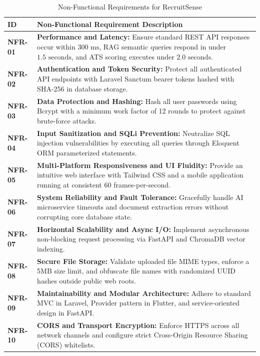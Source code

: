 \begin{table}[H]
\centering
\small
\caption{Non-Functional Requirements for RecruitSense}
\label{tab:non_functional_reqs}
\begin{tabular}{|l|p{12cm}|}
\hline
\textbf{ID} & \textbf{Non-Functional Requirement Description} \\ \hline
\textbf{NFR-01} & \textbf{Performance and Latency:} Ensure standard REST API responses occur within $300\text{ ms}$, RAG semantic queries respond in under $1.5\text{ seconds}$, and ATS scoring executes under $2.0\text{ seconds}$. \\ \hline
\textbf{NFR-02} & \textbf{Authentication and Token Security:} Protect all authenticated API endpoints with Laravel Sanctum bearer tokens hashed with SHA-256 in database storage. \\ \hline
\textbf{NFR-03} & \textbf{Data Protection and Hashing:} Hash all user passwords using Bcrypt with a minimum work factor of 12 rounds to protect against brute-force attacks. \\ \hline
\textbf{NFR-04} & \textbf{Input Sanitization and SQLi Prevention:} Neutralize SQL injection vulnerabilities by executing all queries through Eloquent ORM parameterized statements. \\ \hline
\textbf{NFR-05} & \textbf{Multi-Platform Responsiveness and UI Fluidity:} Provide an intuitive web interface with Tailwind CSS and a mobile application running at consistent 60 frames-per-second. \\ \hline
\textbf{NFR-06} & \textbf{System Reliability and Fault Tolerance:} Gracefully handle AI microservice timeouts and document extraction errors without corrupting core database state. \\ \hline
\textbf{NFR-07} & \textbf{Horizontal Scalability and Async I/O:} Implement asynchronous non-blocking request processing via FastAPI and ChromaDB vector indexing. \\ \hline
\textbf{NFR-08} & \textbf{Secure File Storage:} Validate uploaded file MIME types, enforce a 5MB size limit, and obfuscate file names with randomized UUID hashes outside public web roots. \\ \hline
\textbf{NFR-09} & \textbf{Maintainability and Modular Architecture:} Adhere to standard MVC in Laravel, Provider pattern in Flutter, and service-oriented design in FastAPI. \\ \hline
\textbf{NFR-10} & \textbf{CORS and Transport Encryption:} Enforce HTTPS across all network channels and configure strict Cross-Origin Resource Sharing (CORS) whitelists. \\ \hline
\end{tabular}
\end{table}

